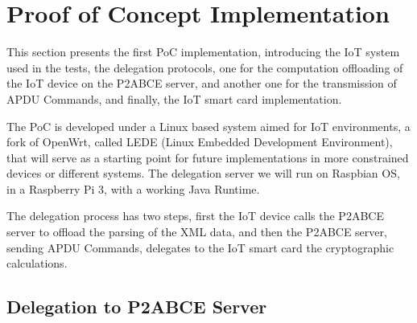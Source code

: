 \section{Proof of Concept Implementation}\label{ch:implementation}
%
%  


This section presents the first PoC implementation, introducing the IoT system used in the tests, the delegation protocols, one for the computation offloading of the IoT device on the P2ABCE server, and another one for the transmission of APDU Commands, and finally, the IoT smart card implementation.

The PoC is developed under a Linux based system aimed for IoT environments, a fork of OpenWrt, called LEDE (Linux Embedded Development Environment), that will serve as a starting point for future implementations in more constrained devices or different systems. 
The delegation server we will run on Raspbian OS, in a Raspberry Pi 3, with a working Java Runtime.





\hfil

The delegation process has two steps, first the IoT device calls the P2ABCE server to offload the parsing of the XML data, and then the P2ABCE server, sending APDU Commands, delegates to the IoT smart card the cryptographic calculations.


\subsection{Delegation to P2ABCE Server}



